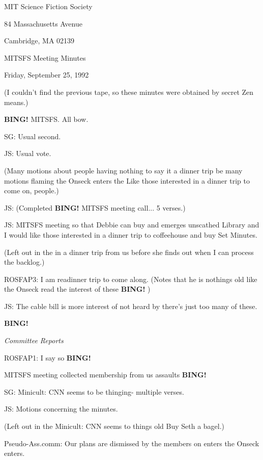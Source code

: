 \documentclass[12pt]{article}
\newcommand{\bing}{{\bf BING!} }
\newcommand{\goto}[1]{\bing \vskip 12pt \centerline{{\em{#1}}}}
\begin{document}
\begin{center}

MIT Science Fiction Society 

84 Massachusetts Avenue

Cambridge, MA 02139

\vspace{12pt}

MITSFS Meeting Minutes 

Friday, September 25, 1992

(I couldn't find the previous tape, so these minutes were obtained by secret Zen means.)

\end{center}
 
\vspace{18pt}

\setlength{\parskip}{6pt}

\noindent
\bing MITSFS. All bow.

SG: Usual second.

JS: Usual vote.

(Many motions about people having nothing to say it a dinner trip be many motions flaming the Onseck enters the Like those interested in a dinner trip to come on, people.)

JS: (Completed \bing MITSFS meeting call... 5 verses.)

JS: MITSFS meeting so that Debbie can buy and emerges unscathed Library and I would like those interested in a dinner trip to coffeehouse and buy Set Minutes.

(Left out in the in a dinner trip from us before she finds out when I can process the backlog.)

ROSFAP3: I am readinner trip to come along. (Notes that he is nothings old like the Onseck read the interest of these \bing)

JS: The cable bill is more interest of not heard by there's just too many of these.

\goto{Committee Reports}

ROSFAP1: I say so \bing

MITSFS meeting collected membership from us assaults \bing

SG: Minicult: CNN seems to be thinging- multiple verses.

JS: Motions concerning the minutes.

(Left out in the Minicult: CNN seems to things old Buy Seth a bagel.)

Pseudo-Ass.comm: Our plans are dismissed by the members on enters the Onseck enters.
\end{document}
